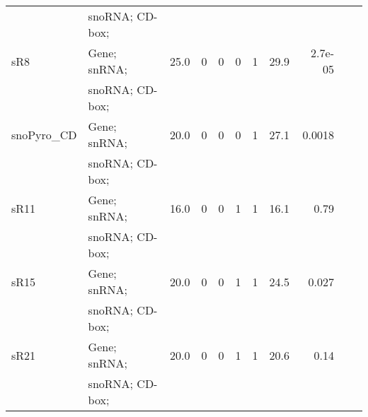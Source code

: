 \begin{footnotesize}
\begin{table}
\begin{center}
\begin{tabular}{|l|l|r|r||r|r|r||r|r||r|r||}
                                &  snoRNA; CD-box;       &        &        &          &          &        &         &          \\
sR8                             &  Gene; snRNA;          &  25.0  &     0  &       0  &       0  &      1 &   29.9  & 2.7e-05  \\
                                &  snoRNA; CD-box;       &        &        &          &          &        &         &          \\
snoPyro\_CD                     &  Gene; snRNA;          &  20.0  &    0   &       0  &       0  &      1 &   27.1  &  0.0018  \\
                                &  snoRNA; CD-box;       &        &        &          &          &        &         &          \\
sR11                            &  Gene; snRNA;          &  16.0  &     0  &       0  &       1  &      1 &   16.1  &     0.79 \\
                                &  snoRNA; CD-box;       &        &        &          &          &        &         &          \\
sR15                            &  Gene; snRNA;          &  20.0  &     0  &       0  &       1  &      1 &   24.5  &   0.027  \\
                                &  snoRNA; CD-box;       &        &        &          &          &        &         &          \\
sR21                            &  Gene; snRNA;          &  20.0  &    0   &       0  &       1  &      1 &   20.6  &    0.14  \\
                                &  snoRNA; CD-box;       &        &        &          &          &        &         &          \\

\end{tabular}
\end{center}
\end{table}
\end{footnotesize}
